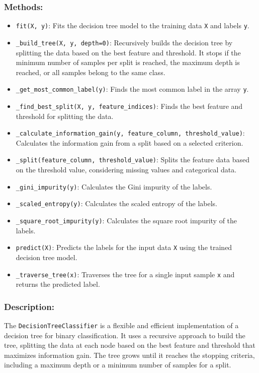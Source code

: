 \documentclass{article}
\begin{document}
\subsubsection*{Methods:}
\begin{itemize}
    \item \texttt{fit(X, y)}: Fits the decision tree model to the training data \texttt{X} and labels \texttt{y}.
    \item \texttt{\_build\_tree(X, y, depth=0)}: Recursively builds the decision tree by splitting the data based on the best feature and threshold. It stops if the minimum number of samples per split is reached, the maximum depth is reached, or all samples belong to the same class.
    \item \texttt{\_get\_most\_common\_label(y)}: Finds the most common label in the array \texttt{y}.
    \item \texttt{\_find\_best\_split(X, y, feature\_indices)}: Finds the best feature and threshold for splitting the data.
    \item \texttt{\_calculate\_information\_gain(y, feature\_column, threshold\_value)}: Calculates the information gain from a split based on a selected criterion.
    \item \texttt{\_split(feature\_column, threshold\_value)}: Splits the feature data based on the threshold value, considering missing values and categorical data.
    \item \texttt{\_gini\_impurity(y)}: Calculates the Gini impurity of the labels.
    \item \texttt{\_scaled\_entropy(y)}: Calculates the scaled entropy of the labels.
    \item \texttt{\_square\_root\_impurity(y)}: Calculates the square root impurity of the labels.
    \item \texttt{predict(X)}: Predicts the labels for the input data \texttt{X} using the trained decision tree model.
    \item \texttt{\_traverse\_tree(x)}: Traverses the tree for a single input sample \texttt{x} and returns the predicted label.
\end{itemize}

\subsubsection*{Description:}
The \texttt{DecisionTreeClassifier} is a flexible and efficient implementation of a decision tree for binary classification. It uses a recursive approach to build the tree, splitting the data at each node based on the best feature and threshold that maximizes information gain. The tree grows until it reaches the stopping criteria, including a maximum depth or a minimum number of samples for a split.
\end{document}
